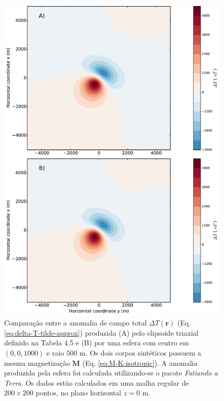 \begin{figure}[hbt!]
	\centering \includegraphics[width=13.0 cm,height=20 cm]{figures/ellipsoid_triaxial_sphere}
	\caption[Comparação entre a anomalia de campo total $\Delta T (\mathbf{r})$ (Eq. \ref{eq:delta-T-tilde-approx}) produzida (A) pelo elipsoide triaxial definido na Tabela 4.5 e (B) por uma esfera com centro em $(0, 0, 1000)$ e raio $500$ m. Os dois corpos sintéticos possuem a mesma magnetização $\mathbf{M}$ (Eq. \ref{eq:M-K-isotropic}). A anomalia produzida pela esfera foi calculada utilizando-se o pacote \textit{Fatiando a Terra}. Os dados estão calculados em uma malha regular de $200 \times 200$ pontos, no plano horizontal $z = 0$ m.]{Comparação entre a anomalia de campo total $\Delta T (\mathbf{r})$ (Eq. \ref{eq:delta-T-tilde-approx}) produzida (A) pelo elipsoide triaxial definido na Tabela 4.5 e (B) por uma esfera com centro em $(0, 0, 1000)$ e raio $500$ m. Os dois corpos sintéticos possuem a mesma magnetização $\mathbf{M}$ (Eq. \ref{eq:M-K-isotropic}). A anomalia produzida pela esfera foi calculada utilizando-se o pacote \textit{Fatiando a Terra}. Os dados estão calculados em uma malha regular de $200 \times 200$ pontos, no plano horizontal $z = 0$ m.}
	\label{fig:triaxial_sphere}
\end{figure}

